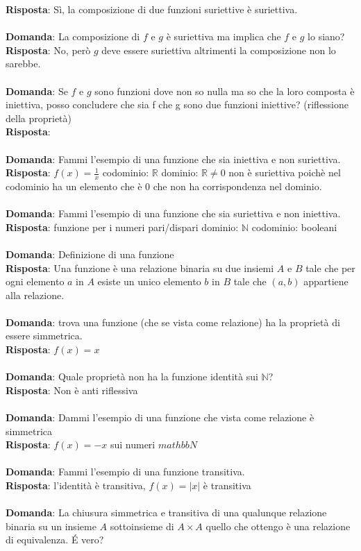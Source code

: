 \documentclass{article}
\begin{document}
\textbf{Risposta}: Sì, la composizione di due funzioni suriettive è suriettiva. \\ \\
\textbf{Domanda}: La composizione di $f$ e $g$ è suriettiva ma implica che $f$ e $g$ lo siano? \\
\textbf{Risposta}: No, però $g$ deve essere suriettiva altrimenti la composizione non lo sarebbe. \\ \\
\textbf{Domanda}: Se $f$ e $g$ sono funzioni dove non so nulla ma so che la loro composta è iniettiva, posso concludere che sia f che g sono due funzioni iniettive? (riflessione della proprietà)\\
\textbf{Risposta}: \\ \\
\textbf{Domanda}: Fammi l'esempio di una funzione che sia iniettiva e non suriettiva. \\
\textbf{Risposta}: $f(x) = \frac{1}{x}$ codominio: $\mathbb{R}$ dominio: $\mathbb{R} \neq 0$ non è suriettiva poichè nel codominio ha un elemento che è 0 che non ha corrispondenza nel dominio.\\ \\
\textbf{Domanda}: Fammi l'esempio di una funzione che sia suriettiva e non iniettiva. \\
\textbf{Risposta}: funzione per i numeri pari/dispari dominio: $\mathbb{N}$ codominio: booleani \\ \\
\textbf{Domanda}: Definizione di una funzione \\
\textbf{Risposta}: Una funzione è una relazione binaria su due insiemi $A$ e $B$ tale che per ogni elemento $a$ in $A$ esiste un unico elemento $b$ in $B$ tale che $(a,b)$ appartiene alla relazione. \\ \\
\textbf{Domanda}: trova una funzione (che se vista come relazione) ha la proprietà di essere simmetrica. \\
\textbf{Risposta}: $f(x)=x$ \\ \\
\textbf{Domanda}: Quale proprietà non ha la funzione identità sui $\mathbb{N}$? \\
\textbf{Risposta}: Non è anti riflessiva \\ \\
\textbf{Domanda}: Dammi l'esempio di una funzione che vista come relazione è simmetrica \\
\textbf{Risposta}: $f(x) = -x$ sui numeri $mathbb{N}$\\ \\
\textbf{Domanda}: Fammi l'esempio di una funzione transitiva. \\
\textbf{Risposta}:  l'identità è transitiva, $f(x)=|x|$ è transitiva \\ \\
\textbf{Domanda}: La chiusura simmetrica e transitiva di una qualunque relazione binaria su un insieme $A$ sottoinsieme di $A \times A$ quello che ottengo è una relazione di equivalenza. \'E vero?
\end{document}
